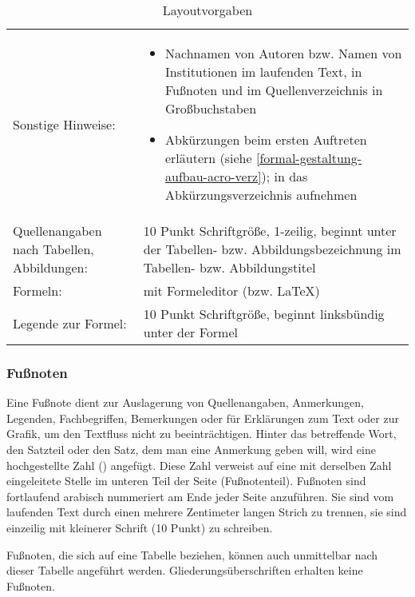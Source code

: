 \begin{table}[H]
\begin{tabularx}{\columnwidth}{|p{4cm}|X|}
    Sonstige Hinweise: & \begin{itemize}
        \item Nachnamen von Autoren bzw. Namen von Institutionen im laufenden Text, in Fußnoten und im Quellenverzeichnis in Großbuchstaben
        \item Abkürzungen beim ersten Auftreten erläutern (siehe \ref{formal-gestaltung-aufbau-acro-verz}); in das Abkürzungsverzeichnis aufnehmen
    \end{itemize}\\
    Quellenangaben nach Tabellen, Abbildungen: & 10 Punkt Schriftgröße, 1-zeilig, beginnt unter der Tabellen- bzw. Abbildungsbezeichnung im Tabellen- bzw. Abbildungstitel\\
    Formeln: & mit Formeleditor (bzw. \LaTeX)\\
    Legende zur Formel: & 10 Punkt Schriftgröße, beginnt linksbündig unter der Formel\\
    \hline
    \end{tabularx}
    \caption{Layoutvorgaben}
    \label{tab-layout}
    \singlespacing
    \normalsize
\end{table}
\subsubsection{Fußnoten}
\label{formal-gestaltung-textteil-fn}
Eine Fußnote dient zur Auslagerung von Quellenangaben, Anmerkungen, Legenden, Fachbegriffen, Bemerkungen oder für Erklärungen zum Text oder zur Grafik, um den Textfluss nicht zu beeinträchtigen.
Hinter das betreffende Wort, den Satzteil oder den Satz, dem man eine Anmerkung geben will, wird eine hochgestellte Zahl () angefügt.
Diese Zahl verweist auf eine mit derselben Zahl eingeleitete Stelle im unteren Teil der Seite (Fußnotenteil).
Fußnoten sind fortlaufend arabisch nummeriert am Ende jeder Seite anzuführen.
Sie sind vom laufenden Text durch einen mehrere Zentimeter langen Strich zu trennen, sie sind einzeilig mit kleinerer Schrift (10 Punkt) zu schreiben.

Fußnoten, die sich auf eine Tabelle beziehen, können auch unmittelbar nach dieser Tabelle angeführt werden.
Gliederungsüberschriften erhalten keine Fußnoten.

